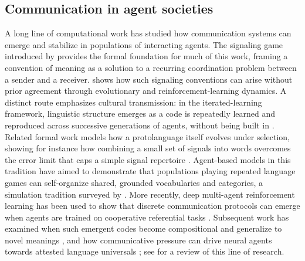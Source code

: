 \documentclass[11pt]{article}
\begin{document}
 \subsection{Communication in agent societies}
A long line of computational work has studied how communication systems can
emerge and stabilize in populations of interacting agents. The signaling game
introduced by \citet{lewis1969communication,lewis1969coordination} provides the formal foundation for
much of this work, framing a convention of meaning as a solution to a recurring
coordination problem between a sender and a receiver. \citet{skyrms2010signals}
shows how such signaling conventions can arise without prior agreement through
evolutionary and reinforcement-learning dynamics. A distinct route emphasizes
cultural transmission: in the iterated-learning framework, linguistic structure
emerges as a code is repeatedly learned and reproduced across successive
generations of agents, without being built in \citep{smith2003iterated}. Related
formal work models how a protolanguage itself evolves under selection, showing
for instance how combining a small set of signals into words overcomes the error
limit that caps a simple signal repertoire \citep{nowak1999evolution}.
Agent-based models in this tradition have aimed to demonstrate that populations
playing repeated language games can self-organize shared, grounded vocabularies
and categories, a simulation tradition surveyed by \citet{wagner2003progress}.
More recently, deep multi-agent reinforcement learning has been used to show
that discrete communication protocols can emerge when agents are trained on
cooperative referential tasks \citep{lazaridou2017multi}. Subsequent work has
examined when such emergent codes become compositional and generalize to novel
meanings \citep{chaabouni2020compositionality}, and how communicative pressure
can drive neural agents towards attested language universals
\citep{lian2023communication}; see \citet{lazaridou2020emergent} for a review of
this line of research.
\end{document}
